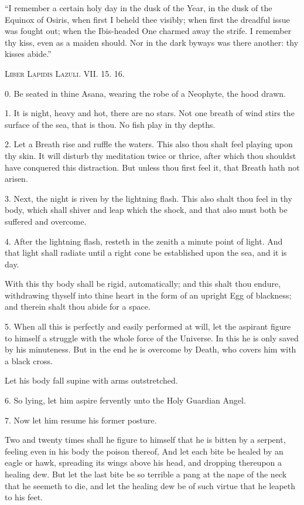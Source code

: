 \epigraph{\enquote{I remember a certain holy day in the dusk of the Year, in the dusk of the Equinox of Osiris, when first I beheld thee visibly; when first the dreadful issue was fought out; when the Ibis-headed One charmed away the strife. I remember thy kiss, even as a maiden should. Nor in the dark byways was there another: thy kisses abide.}}{\textsc{Liber Lapidis Lazuli. VII. 15. 16.}}


0. Be seated in thine Asana, wearing the robe of a Neophyte, the hood drawn.

1. It is night, heavy and hot, there are no stars. Not one breath of wind stirs the surface of the sea, that is thou. No fish play in thy depths.

2. Let a Breath rise and ruffle the waters. This also thou shalt feel playing upon thy skin. It will disturb thy meditation twice or thrice, after which thou shouldst have conquered this distraction. But unless thou first feel it, that Breath hath not arisen.

3. Next, the night is riven by the lightning flash. This also shalt thou feel in thy body, which shall shiver and leap which the shock, and that also must both be suffered and overcome.

4. After the lightning flash, resteth in the zenith a minute point of light. And that light shall radiate until a right cone be established upon the sea, and it is day.

With this thy body shall be rigid, automatically; and this shalt thou endure, withdrawing thyself into thine heart in the form of an upright Egg of blackness; and therein shalt thou abide for a space.

5. When all this is perfectly and easily performed at will, let the aspirant figure to himself a struggle with the whole force of the Universe. In this he is only saved by his minuteness. But in the end he is overcome by Death, who covers him with a black cross.

Let his body fall supine with arms outstretched.

6. So lying, let him aspire fervently unto the Holy Guardian Angel.

7. Now let him resume his former posture.

Two and twenty times shall he figure to himself that he is bitten by a serpent, feeling even in his body the poison thereof, And let each bite be healed by an eagle or hawk, spreading its wings above his head, and dropping thereupon a healing dew. But let the last bite be so terrible a pang at the nape of the neck that he seemeth to die, and let the healing dew be of such virtue that he leapeth to his feet.

